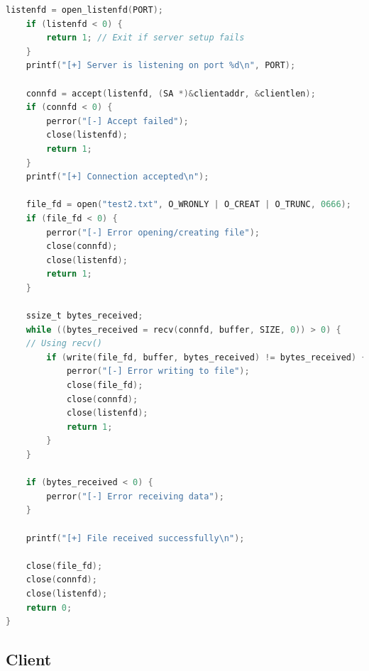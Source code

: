 \documentclass{article}
\begin{document}
\begin{lstlisting}[language=C, caption=Sever C Code, label=lst:code]
    listenfd = open_listenfd(PORT);
    if (listenfd < 0) {
        return 1; // Exit if server setup fails
    }
    printf("[+] Server is listening on port %d\n", PORT);

    connfd = accept(listenfd, (SA *)&clientaddr, &clientlen);
    if (connfd < 0) {
        perror("[-] Accept failed");
        close(listenfd);
        return 1;
    }
    printf("[+] Connection accepted\n");

    file_fd = open("test2.txt", O_WRONLY | O_CREAT | O_TRUNC, 0666);
    if (file_fd < 0) {
        perror("[-] Error opening/creating file");
        close(connfd);
        close(listenfd);
        return 1;
    }

    ssize_t bytes_received;
    while ((bytes_received = recv(connfd, buffer, SIZE, 0)) > 0) {  
    // Using recv()
        if (write(file_fd, buffer, bytes_received) != bytes_received) {
            perror("[-] Error writing to file");
            close(file_fd);
            close(connfd);
            close(listenfd);
            return 1;
        }
    }

    if (bytes_received < 0) {
        perror("[-] Error receiving data");
    }

    printf("[+] File received successfully\n");

    close(file_fd);
    close(connfd);
    close(listenfd);
    return 0;
}
\end{lstlisting}

\subsection{Client}
\end{document}
